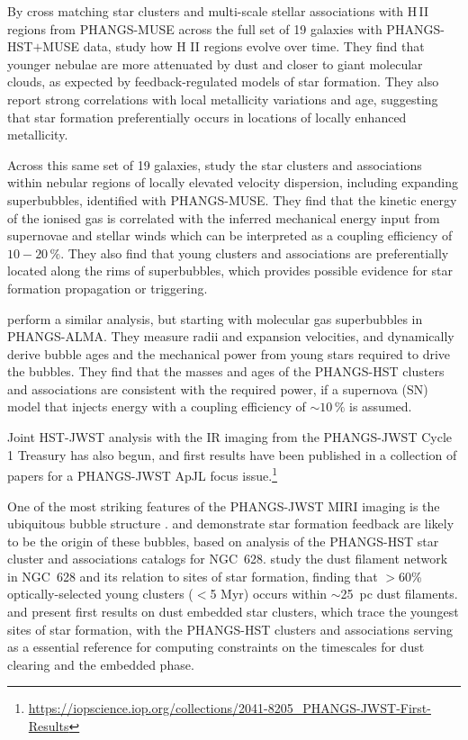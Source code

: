 \documentclass[]{aastex631}
\begin{document}
By cross matching star clusters and multi-scale stellar associations with H\,II regions from PHANGS-MUSE across the full set of 19 galaxies with PHANGS-HST$+$MUSE data, \citet{scheuermann_stellar_2023} study how H II regions evolve over time.   They find that younger nebulae are more attenuated by dust and closer to giant molecular clouds, as expected by feedback-regulated models of star formation.  They also report strong correlations with local metallicity variations and age, suggesting that star formation preferentially occurs in locations of locally enhanced metallicity. 

Across this same set of 19 galaxies, \citet{egorov_quantifying_2023} study the star clusters and associations within nebular regions of locally elevated velocity dispersion, including expanding superbubbles, identified with PHANGS-MUSE.  They find that the kinetic energy of the ionised gas is correlated with the inferred mechanical energy input from supernovae and stellar winds which can be interpreted as a coupling efficiency of $10-20\,\%$. They also find that young clusters and associations are preferentially located along the rims of superbubbles, which provides possible evidence for star formation propagation or triggering. 

\citet{watkins_quantifying_2023} perform a similar analysis, but starting with molecular gas superbubbles in PHANGS-ALMA.  They measure radii and expansion velocities, and dynamically derive bubble ages and the mechanical power from young stars required to drive the bubbles. They find that the masses and ages of the PHANGS-HST clusters and associations are consistent with the required power, if a supernova (SN) model that injects energy with a coupling efficiency of $\sim10\,\%$ is assumed.  

Joint HST-JWST analysis with the IR imaging from the PHANGS-JWST Cycle 1 Treasury has also begun, and first results have been published in a collection of papers for a PHANGS-JWST ApJL focus issue.\footnote{\url{https://iopscience.iop.org/collections/2041-8205_PHANGS-JWST-First-Results}}  

One of the most striking features of the PHANGS-JWST MIRI imaging is the ubiquitous bubble structure \citep{lee_phangs-jwst_2023, williams_phangs-jwst_2024}. \citet{watkins_phangs-jwst_2023} and \citet{barnes_phangs-jwst_2023} demonstrate star formation feedback are likely to be the origin of these bubbles, based on analysis of the PHANGS-HST star cluster and associations catalogs for NGC~628.  \citet{thilker_phangs-jwst_2023} study the dust filament network in NGC~628 and its relation to sites of star formation, finding that $>$60\% optically-selected young clusters ($<$5 Myr) occurs within $\sim$25~pc dust filaments. \citet{rodriguez_phangs-jwst_2023} and \citet{whitmore_phangs-jwst_2023} present first results on dust embedded star clusters, which trace the youngest sites of star formation, with the PHANGS-HST clusters and associations serving as a essential reference for computing constraints on the timescales for dust clearing and the embedded phase.
\end{document}
